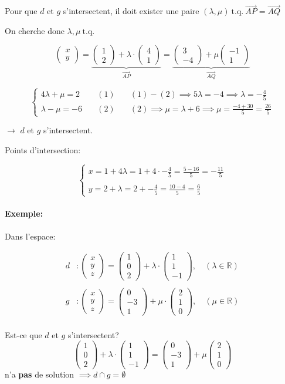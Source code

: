 \documentclass[
    11pt,
    a4paper,
    oneside,
    headinlcude, footinclude,
    twoside,
]{report}
\newcommand{\myVector}[3]{\begin{pmatrix}#1\\#2\\#3\end{pmatrix}}
\newcommand{\myVectorII}[2]{\begin{pmatrix}#1\\#2\end{pmatrix}}
\renewcommand{\vec}[1]{\overrightarrow{#1}}
\newcommand{\tq}[0]{ \ \textrm{t.q.}\ }
\begin{document}
Pour que $d$  et $g$ s'intersectent, il doit exister une paire $(\lambda, \mu)
\tq \vec{AP} = \vec{AQ}$ 

On cherche donc $\lambda, \mu \tq$ 

$$ \myVectorII x y = \underbrace{\myVectorII 1 2 + \lambda \cdot \myVectorII 4 1}_{\vec{AP}}
= \underbrace{\myVectorII 3 {-4} + \mu \myVectorII{-1} 1}_{\vec{AQ}}$$

$$\left\{
    \begin{array}{lll}
        4 \lambda + \mu = 2 &\quad(1)\quad& (1) - (2)\implies 5 \lambda = -4
        \implies \lambda = - \frac{4}{5}\\

        \lambda - \mu = -6  &\quad(2)\quad& (2) \implies \mu = \lambda + 6
        \implies \mu = \frac{-4 + 30}{5} = \frac{26}{5}
    \end{array}
\right.$$

$\longrightarrow$ $d$ et $g$ s'intersectent.

Points d'intersection:

$$\left\{
    \begin{array}{l}
        x = 1 +  4 \lambda = 1 + 4 \cdot - \frac{4}{5} = \frac{5 - 16}{5} = -
        \frac{11}{5}\\
        \\
        y = 2 + \lambda  = 2 + - \frac{4}{5} = \frac{10 -4}{5} = \frac{6}{5}
    \end{array}
\right.$$

\paragraph{Exemple:}

Dans l'espace:

        \[
            \begin{split}
                d &: \myVector x y z = \myVector 1 0 2 + \lambda \cdot
                \myVector 1 1 {-1}, \quad(\lambda \in \mathbb{R})\\
                \\
                g &: \myVector x y z = \myVector 0 {-3} 1 + \mu \cdot
                \myVector 2 1 0, \quad(\mu \in \mathbb{R})\\
            \end{split}
        \]

Est-ce que $d$ et $g$ s'intersectent?
$$ \myVector 1 0 2 + \lambda \cdot \myVector 1 1 {-1} = \myVector 0 {-3} 1 +
\mu \myVector 2 1 0$$
n'a \textbf{pas} de solution $\implies d \cap g = \emptyset$ 
\end{document}

